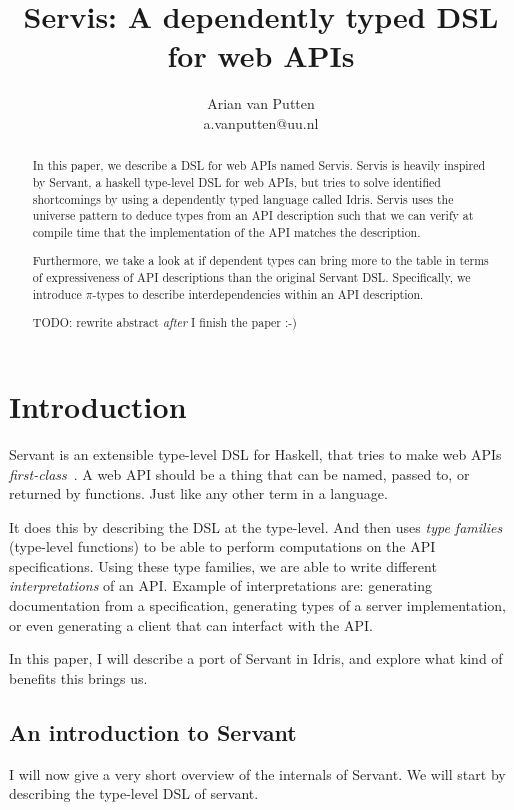 \documentclass[12pt,a4paper]{article}
\author{Arian van Putten \\ a.vanputten@uu.nl}
\title{Servis: A dependently typed DSL for web APIs}
\begin{document}
\maketitle
\begin{abstract}
In this paper, we describe a DSL for web APIs named Servis. Servis is heavily inspired by Servant, a haskell type-level DSL for web APIs,  but tries to solve identified shortcomings by using a dependently typed language called Idris. Servis uses the universe pattern to deduce types from an API description such that we can verify at compile time that the implementation of the API matches the description.

Furthermore, we take a look at if dependent types can bring more to the table in terms of expressiveness of API descriptions than the original Servant DSL\@. Specifically, we introduce $\pi$-types to describe interdependencies within an API description.

  TODO: rewrite abstract \emph{after} I finish the paper :-)

\end{abstract}

\section{Introduction}
Servant is an extensible type-level DSL for Haskell, that tries to make web APIs \emph{first-class}~\cite{servant}. A web API should be a thing that can be named, passed to, or returned by functions. Just like any other term in a language.

It does this by describing the DSL at the type-level. And then uses \emph{type families} (type-level functions) to be able to perform computations on the API specifications.  Using these type families, we are able to write different \emph{interpretations} of an API\@.  Example of interpretations are: generating documentation from a specification, generating types of a server implementation, or even generating a client that can interfact with the API\@.

In this paper, I will describe a port of Servant in Idris, and explore what kind of benefits this brings us.

\subsection{An introduction to Servant}
I will now give a very short overview of the internals of Servant. We will start by describing the type-level DSL of servant. 
\end{document}
